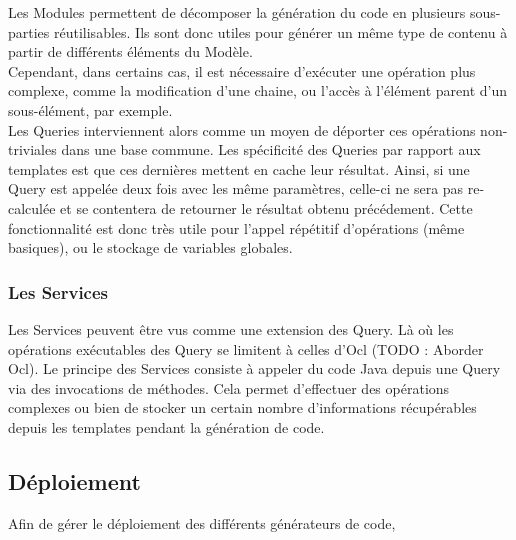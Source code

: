Les Modules permettent de décomposer la génération du code en plusieurs sous-parties réutilisables. Ils sont donc utiles pour générer un même type de contenu à partir de différents éléments du Modèle.\\
Cependant, dans certains cas, il est nécessaire d'exécuter une opération plus complexe, comme la modification d'une chaine, ou l'accès à l'élément parent d'un sous-élément, par exemple.\\
Les Queries interviennent alors comme un moyen de déporter ces opérations non-triviales dans une base commune. Les spécificité des Queries par rapport aux templates est que ces dernières mettent en cache leur résultat. Ainsi, si une Query est appelée deux fois avec les même paramètres, celle-ci ne sera pas re-calculée et se contentera de retourner le résultat obtenu précédement. Cette fonctionnalité est donc très utile pour l'appel répétitif d'opérations (même basiques), ou le stockage de variables globales.

\subsubsection{Les Services}

Les Services peuvent être vus comme une extension des Query. Là où les opérations exécutables des Query se limitent à celles d'Ocl (TODO : Aborder Ocl). Le principe des Services consiste à appeler du code Java depuis une Query via des invocations de méthodes. Cela permet d'effectuer des opérations complexes ou bien de stocker un certain nombre d'informations récupérables depuis les templates pendant la génération de code.


\subsection{Déploiement}

Afin de gérer le déploiement des différents générateurs de code, 



 



